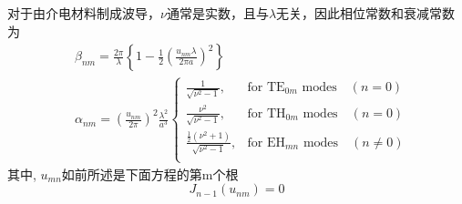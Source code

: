 \documentclass[14pt,a4paper,oneside]{article}
\numberwithin{equation}{subsection}             %
\numberwithin{figure}{subsection}               %
\begin{document}
对于由介电材料制成波导，$\nu$通常是实数，且与$\lambda$无关，因此相位常数和衰减常数为
\begin{equation}
    \begin{aligned}
        &\beta_{nm}=\frac{2\pi}\lambda\left\{1-\frac12\left(\frac{u_{nm}\lambda}{2\pi a}\right)^2\right\}\\
        &\alpha_{nm}=\left(\frac{u_{nm}}{2\pi}\right)^2\frac{\lambda^2}{a^3}\begin{cases}
            \frac1{\sqrt{\nu^2-1}},&\text{for TE}_{0m}\text{ modes}\quad(n=0)\\
            \frac{\nu^2}{\sqrt{\nu^2-1}},&\text{for TH}_{0m}\text{ modes}\quad(n=0)\\
            \frac{\frac12(\nu^2+1)}{\sqrt{\nu^2-1}},&\text{for EH}_{mn}\text{ modes}\quad(n\neq0)\\
        \end{cases}
    \end{aligned}
    \label{eq:A.16}
\end{equation}
其中, $u_{mn}$如前所述是下面方程的第m个根
\begin{equation}
    J_{n-1}(u_{nm})=0
    \label{eq:A.17}
\end{equation}

\newpage

\clearpage           %
{}      %
{}   %


\end{document}
